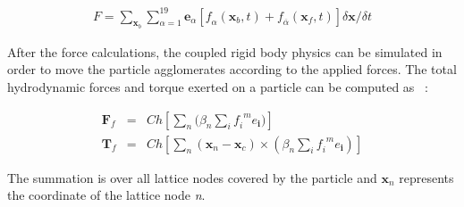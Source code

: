 \begin{align}
\mathit{F} = 
\sum\limits_{\mathbf{x}_{b}}\sum\limits_{\alpha=1}^{19}{\mathbf{e}_{\alpha}[\mathit{f}_{\alpha}(\mathbf{x}_{b},t)+\mathit{f}_{\overline{\alpha}}(\mathbf{x}_{f},t)]
 \delta \mathbf{x} / \delta t}
\end{align}

After the force calculations, the coupled rigid body physics can be simulated 
in order to move the particle agglomerates according to the applied forces. The 
total hydrodynamic forces and torque exerted on a particle can be computed as 
~\citep{Cook2004, Noble1998}:

\begin{align}
\mathbf{F}_{f} & = & \mathit{Ch}[\sum\limits_{\mathit{n}}{(\beta_{\mathit{n}} 
\sum\limits_{\mathit{i}}{\mathit{f_i}^{\mathit{ m}}\mathbf{\mathit{e}_i}}})] \\ 
\mathbf{T}_{f} & = & 
\mathit{Ch}[\sum\limits_{\mathit{n}}{(\mathbf{x}_{\mathit{n}}-\mathbf{x}_{\mathit{c}})
 \times (\beta_{\mathit{n}} \sum\limits_{\mathit{i}}{\mathit{f_i}^{\mathit{ 
m}}\mathbf{\mathit{e}_i}})}]
\end{align}

The summation is over all lattice nodes covered by the particle and 
$\mathbf{x}_{\mathit{n}}$ represents the coordinate of the lattice node 
\textit{n}.

